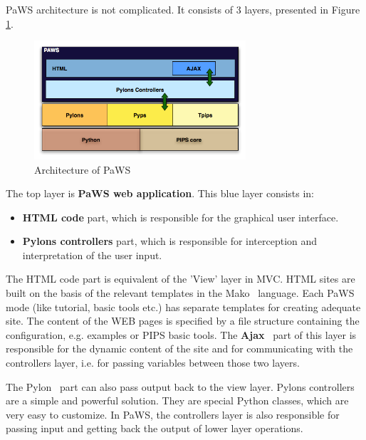 PaWS architecture is not complicated. It consists of 3 layers,
presented in Figure \ref{fig:paws_architecture}.

\begin{figure}[h!]
  \centering
  \includegraphics[width=0.7\textwidth]{reportCh2/paws}
  \caption{Architecture of PaWS}
  \label{fig:paws_architecture}
\end{figure}

The top layer is {\bf PaWS web application}. This blue layer consists in:

\begin{itemize}

\item {\bf HTML code} part, which is responsible for the graphical user
  interface. 

\item {\bf Pylons controllers} part, which is responsible for
  interception and interpretation of the user input.

\end{itemize}

The HTML code part is equivalent of the 'View' layer in MVC. HTML
sites are built on the basis of the relevant templates in the
Mako~\cite{} language. Each PaWS mode (like tutorial, basic tools
etc.) has separate templates for creating adequate site. The content
of the WEB pages is specified by a file structure containing the
configuration, e.g. examples or PIPS basic tools. The {\bf
  Ajax}~\cite{} part of this layer is responsible for the dynamic
content of the site and for communicating with the controllers layer,
i.e. for passing variables between those two layers.

The Pylon~\cite{} part can also pass output back to the view layer. Pylons
controllers are a simple and powerful solution. They are special
Python classes, which are very easy to customize. In PaWS, the
controllers layer is also responsible for passing input and getting
back the output of lower layer operations.

